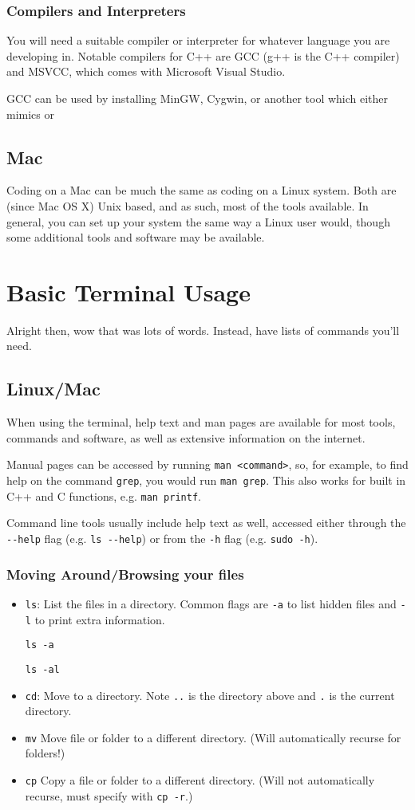 \documentclass[12pt]{book}
\begin{document}
			\subsection{Compilers and Interpreters}
				You will need a suitable compiler or interpreter for whatever language you are developing in.  Notable compilers for C++ are GCC (g++ is the C++ compiler) and MSVCC, which comes with Microsoft Visual Studio.
				
				GCC can be used by installing MinGW, Cygwin, or another tool which either mimics or 
		\section{Mac}
			Coding on a Mac can be much the same as coding on a Linux system.  Both are (since Mac OS X) Unix based, and as such, most of the tools available.  In general, you can set up your system the same way a Linux user would, though some additional tools and software may be available.  %
			
	\chapter{Basic Terminal Usage}
		Alright then, wow that was lots of words.  Instead, have lists of commands you'll need.
		\section{Linux/Mac}
			When using the terminal, help text and man pages are available for most tools, commands and software, as well as extensive information on the internet.
			
			Manual pages can be accessed by running \verb+man <command>+, so, for example, to find help on the command \verb+grep+, you would run \verb+man grep+.  This also works for built in C++ and C functions, e.g. \verb+man printf+.
			
			Command line tools usually include help text as well, accessed either through the \verb+--help+ flag (e.g. \verb+ls --help+) or from the \verb+-h+ flag (e.g. \verb+sudo -h+).
			\subsection{Moving Around/Browsing your files}
				\begin{itemize}
					\item \verb+ls+: List the files in a directory.  Common flags are \verb+-a+ to list hidden files and \verb+-l+ to print extra information.
					
						\verb+ls -a+
						
						\verb+ls -al+
					\item \verb+cd+: Move to a directory.  Note \verb+..+ is the directory above and \verb+.+ is the current directory.
					\item \verb+mv+ Move file or folder to a different directory. (Will automatically recurse for folders!)
					\item \verb+cp+ Copy a file or folder to a different directory. (Will not automatically recurse, must specify with \verb+cp -r+.)
				\end{itemize}
\end{document}
